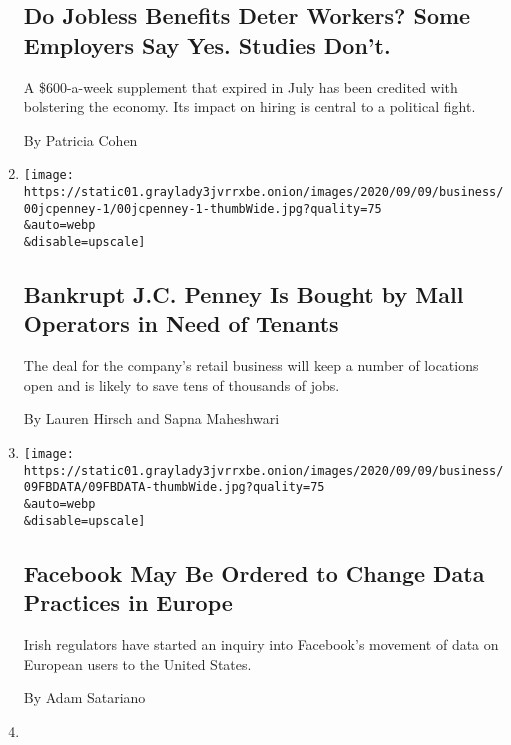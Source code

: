\begin{enumerate}
{  \subsection{Do Jobless Benefits Deter Workers? Some Employers Say Yes.
  Studies
  Don't.}\label{do-jobless-benefits-deter-workers-some-employers-say-yes-studies-dont}}

  A \$600-a-week supplement that expired in July has been credited with
  bolstering the economy. Its impact on hiring is central to a political
  fight.

  By Patricia Cohen
\item
  \href{/2020/09/09/business/jc-penney-sale-simon-brookfield.html}{}

  \texttt{[image: https://static01.graylady3jvrrxbe.onion/images/2020/09/09/business/00jcpenney-1/00jcpenney-1-thumbWide.jpg?quality=75\\\&auto=webp\\\&disable=upscale]}

  \hypertarget{bankrupt-jc-penney-is-bought-by-mall-operators-in-need-of-tenants}{%
  \subsection{Bankrupt J.C. Penney Is Bought by Mall Operators in Need
  of
  Tenants}\label{bankrupt-jc-penney-is-bought-by-mall-operators-in-need-of-tenants}}

  The deal for the company's retail business will keep a number of
  locations open and is likely to save tens of thousands of jobs.

  By Lauren Hirsch and Sapna Maheshwari
\item
  \href{/2020/09/09/technology/facebook-european-union-data-privacy.html}{}

  \texttt{[image: https://static01.graylady3jvrrxbe.onion/images/2020/09/09/business/09FBDATA/09FBDATA-thumbWide.jpg?quality=75\\\&auto=webp\\\&disable=upscale]}

  \hypertarget{facebook-may-be-ordered-to-change-data-practices-in-europe}{%
  \subsection{Facebook May Be Ordered to Change Data Practices in
  Europe}\label{facebook-may-be-ordered-to-change-data-practices-in-europe}}

  Irish regulators have started an inquiry into Facebook's movement of
  data on European users to the United States.

  By Adam Satariano
\item
  \href{/2020/09/09/business/economy/labor-joint-employers.html}{}


\end{enumerate}
